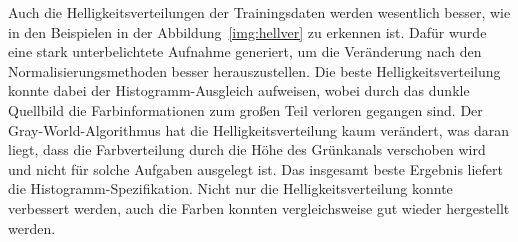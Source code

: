 Auch die Helligkeitsverteilungen der Trainingsdaten werden wesentlich besser, wie in den Beispielen in der Abbildung~\ref{img:hellver} zu erkennen ist. Dafür wurde eine stark unterbelichtete Aufnahme generiert, um die Veränderung nach den Normalisierungsmethoden besser herauszustellen. Die beste Helligkeitsverteilung konnte dabei der Histogramm-Ausgleich aufweisen, wobei durch das dunkle Quellbild die Farbinformationen zum großen Teil verloren gegangen sind. Der Gray-World-Algorithmus hat die Helligkeitsverteilung kaum verändert, was daran liegt, dass die Farbverteilung durch die Höhe des Grünkanals verschoben wird und nicht für solche Aufgaben ausgelegt ist. Das insgesamt beste Ergebnis liefert die Histogramm-Spezifikation. Nicht nur die Helligkeitsverteilung konnte verbessert werden, auch die Farben konnten vergleichsweise gut wieder hergestellt werden.
